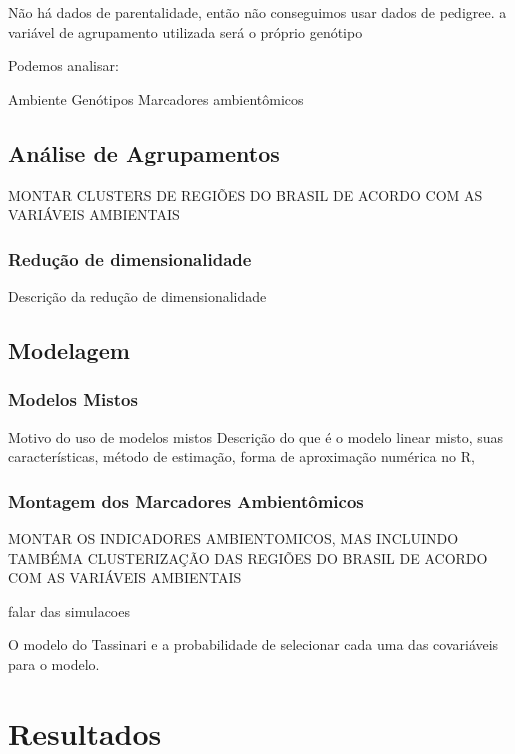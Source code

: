 \documentclass[12pt, a4paper, twoside]{report}
\numberwithin{equation}{subsection} %
\begin{document}
Não há dados de parentalidade, então não conseguimos usar dados de pedigree. a variável de agrupamento utilizada será o próprio genótipo

Podemos analisar:

Ambiente
Genótipos
Marcadores ambientômicos

\section{Análise de Agrupamentos}

MONTAR CLUSTERS DE REGIÕES DO BRASIL DE ACORDO COM AS VARIÁVEIS AMBIENTAIS

\subsection{Redução de dimensionalidade}

Descrição da redução de dimensionalidade

\section{Modelagem}

\subsection{Modelos Mistos}

Motivo do uso de modelos mistos
Descrição do que é o modelo linear misto, suas características, método de estimação, forma de aproximação numérica no R,


\subsection{Montagem dos Marcadores Ambientômicos}

MONTAR OS INDICADORES AMBIENTOMICOS, MAS INCLUINDO TAMBÉMA CLUSTERIZAÇÃO DAS REGIÕES DO BRASIL DE ACORDO COM AS VARIÁVEIS AMBIENTAIS

falar das simulacoes

O modelo do Tassinari e a probabilidade de selecionar cada uma das covariáveis para o modelo.



\chapter{Resultados}
\end{document}
